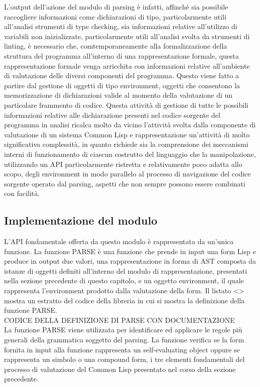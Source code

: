 L’output dell’azione del modulo di parsing è infatti, affinché sia possibile
raccogliere informazioni come dichiarazioni di tipo, particolarmente utili
all'analisi strumenti di type checking, sia informazioni relative all’utilizzo
di variabili non inizializzate, particolarmente utili all’analisi svolta da
strumenti di linting, è necessario che, comtemporaneamente alla
formalizzazione della struttura del programma all’interno di una
rappresentazione formale, questa rappresentazione formale venga arricchita con
informazioni relative all’ambiente di valutazione delle diversi componenti del
programma. Questo viene fatto a partire dal gestione di oggetti di tipo
environment, oggetti che consentono la memorizzazione di dichiarazioni valide
al momento della valutazione di un particolare frammento di codice. Questa
attività di gestione di tutte le possibili informazioni relative alle
dichiarazione presenti nel codice sorgente del programma in analisi ricalca
molto da vicino l’attività svolta dalla componente di valutazione di un
sistema Common Lisp e rappresentazione un’attività di molto significativa
complessità, in quanto richiede sia la comprensione dei meccanismi interni di
funzionamento di ciascun costrutto del linguaggio che la manipolazione,
utilizzando un API particolarmente ristretta e relativamente poco adatta allo
scopo, degli environment in modo parallelo al processo di navigazione del
codice sorgente operato dal parsing, aspetti che non sempre possono essere
combinati con facilità.

\subsection{Implementazione del modulo}

L’API fondamentale offerta da questo modulo è rappresentata da un’unica
funzione. La funzione PARSE è una funzione che prende in input una form Lisp e
produce in output due valori, una rappresentazione in forma di AST composta da
istanze di oggetti definiti all’interno del modulo di rappresentazione,
presentati nella sezione precedente di questo capitolo, e un oggetto
environment, il quale rappresenta l’environment prodotto dalla valutazione
della form. Il listato <> mostra un estratto del codice della libreria in cui
si mostra la definizione della funzione PARSE.\\

CODICE DELLA DEFINIZIONE DI PARSE CON DOCUMENTAZIONE\\

La funzione PARSE viene utilizzata per identificare ed applicare le regole più
generali della grammatica soggetto del parsing. La funzione verifica se la
form fornita in input alla funzione rappresenta un self-evaluating object
oppure se rappresenta un simbolo o una compound form, i tre elementi
fondamentali del processo di valutazione del Common Lisp presentato nel corso
della sezione precedente.\\

